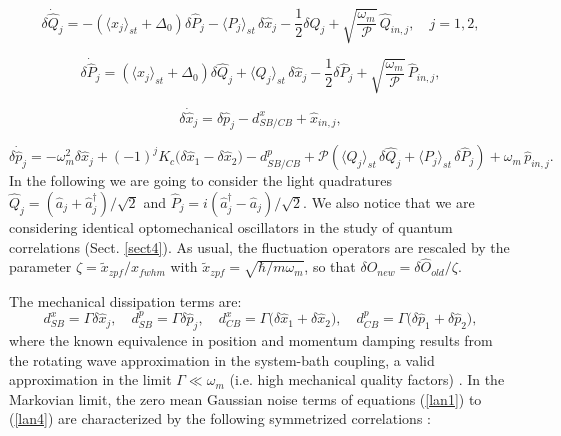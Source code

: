 \documentclass[a4paper]{jpconf}
\begin{document}
\begin{equation}\label{lan1}
\delta\dot{\hat{Q}}_j=-(\langle{x}_{j}\rangle_{st}+\Delta_0) \delta 
\hat{P}_j-\langle{P}_{j}\rangle_{st}\, \delta \hat{x}_{j}-\frac{1}{2} \delta \hat{Q}_j+ 
\sqrt{\frac{\omega_{m}}{\mathcal{P}}}\,\hat{Q}_{in,j}, \quad j=1,2,
\end{equation}

\begin{equation}\label{lan2}
\delta\dot{\hat{P}}_j=(\langle{x}_{j}\rangle_{st}+\Delta_0) \delta \hat{Q}_j+\langle{Q}_{j}\rangle_{st}\,
\delta \hat{x}_j-\frac{1}{2} \delta \hat{P}_j+ 
\sqrt{\frac{\omega_{m}}{\mathcal{P}}}\,\hat{P}_{in,j},
\end{equation}

\begin{equation}\label{lan3}
\delta\dot{\hat{x}}_j=\delta \hat{p}_j-d^x_{SB/CB}+ \hat{x}_{in,j},
\end{equation}

\begin{equation}\label{lan4}
\delta\dot{\hat{p}}_j=-\omega^2_{m}  \delta \hat{x}_j+(-1)^j K_c\big(\delta 
\hat{x}_{1}-\delta \hat{x}_{2}\big)-d^p_{SB/CB}+\mathcal{P} 
(\langle{Q}_{j}\rangle_{st}\,\delta \hat{Q}_j+\langle{P}_{j}\rangle_{st}\,\delta \hat{P}_j)+\omega_{m} \, 
\hat{p}_{in,j}.
\end{equation}
In the following we are going to consider the light quadratures 
$\hat{Q}_j=(\hat{a}_j+\hat{a}_j^{\dagger})/\sqrt{2}$ and  
$\hat{P}_j=i(\hat{a}_j^{\dagger}-\hat{a}_j)/\sqrt{2}$. We also notice 
 that we are considering identical optomechanical oscillators in the study of quantum correlations (Sect. \ref{sect4}). 
As usual, the fluctuation operators are rescaled by the parameter 
$\zeta=\tilde{x}_{zpf}/x_{fwhm}$ with $\tilde{x}_{zpf}=\sqrt{\hbar/m\omega_m}$, 
so that $\delta \hat{O}_{new}=\delta \hat{O}_{old}/\zeta$. 

The mechanical dissipation terms are:
\begin{equation}
\label{dissCBSB}
d^{x}_{SB}=\Gamma\delta\hat{x}_j, \quad d^p_{SB}=\Gamma\delta\hat{p}_j,\quad 
d^{x}_{CB}=\Gamma\big(\delta\hat{x}_1+\delta\hat{x}_2\big),\quad 
d^p_{CB}=\Gamma\big(\delta\hat{p}_{1}+\delta\hat{p}_{2}\big),
\end{equation}
where the known equivalence in position and momentum damping results from the 
rotating wave approximation in the system-bath coupling, a valid approximation 
in the
limit $\Gamma\ll\omega_m$ (i.e. high mechanical quality 
factors) \cite{26}. In the Markovian limit, the zero mean Gaussian noise terms of equations (\ref{lan1}) to (\ref{lan4}) are characterized by the following  symmetrized
correlations \cite{22}:
\end{document}

